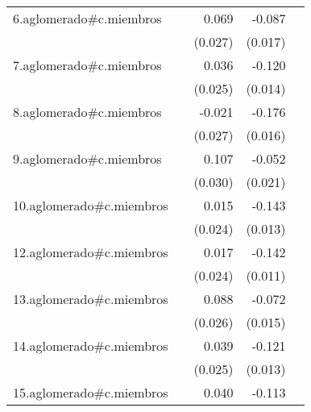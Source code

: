 {\begin{longtable}{l*{4}{D{.}{.}{-1}}}
\addlinespace
6.aglomerado#c.miembros&                     &       0.069\sym{*}  &      -0.087\sym{***}&                     \\
            &                     &     (0.027)         &     (0.017)         &                     \\
\addlinespace
7.aglomerado#c.miembros&                     &       0.036         &      -0.120\sym{***}&                     \\
            &                     &     (0.025)         &     (0.014)         &                     \\
\addlinespace
8.aglomerado#c.miembros&                     &      -0.021         &      -0.176\sym{***}&                     \\
            &                     &     (0.027)         &     (0.016)         &                     \\
\addlinespace
9.aglomerado#c.miembros&                     &       0.107\sym{***}&      -0.052\sym{*}  &                     \\
            &                     &     (0.030)         &     (0.021)         &                     \\
\addlinespace
10.aglomerado#c.miembros&                     &       0.015         &      -0.143\sym{***}&                     \\
            &                     &     (0.024)         &     (0.013)         &                     \\
\addlinespace
12.aglomerado#c.miembros&                     &       0.017         &      -0.142\sym{***}&                     \\
            &                     &     (0.024)         &     (0.011)         &                     \\
\addlinespace
13.aglomerado#c.miembros&                     &       0.088\sym{***}&      -0.072\sym{***}&                     \\
            &                     &     (0.026)         &     (0.015)         &                     \\
\addlinespace
14.aglomerado#c.miembros&                     &       0.039         &      -0.121\sym{***}&                     \\
            &                     &     (0.025)         &     (0.013)         &                     \\
\addlinespace
15.aglomerado#c.miembros&                     &       0.040         &      -0.113\sym{***}&                     \\

\end{longtable}}
